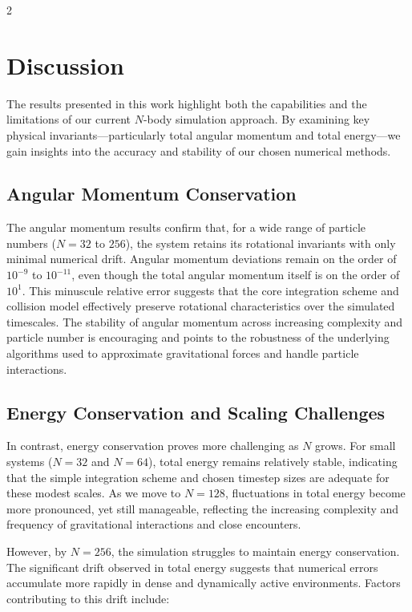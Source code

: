 \documentclass[a4paper, 12pt, oneside, onecolumn]{article}
\begin{document}
\begin{multicols}{2}

\section{Discussion}

The results presented in this work highlight both the capabilities and the limitations of our current $N$-body simulation approach. By examining key physical invariants—particularly total angular momentum and total energy—we gain insights into the accuracy and stability of our chosen numerical methods.

\subsection*{Angular Momentum Conservation}

The angular momentum results confirm that, for a wide range of particle numbers ($N = 32$ to $256$), the system retains its rotational invariants with only minimal numerical drift. Angular momentum deviations remain on the order of $10^{-9}$ to $10^{-11}$, even though the total angular momentum itself is on the order of $10^1$. This minuscule relative error suggests that the core integration scheme and collision model effectively preserve rotational characteristics over the simulated timescales. The stability of angular momentum across increasing complexity and particle number is encouraging and points to the robustness of the underlying algorithms used to approximate gravitational forces and handle particle interactions.

\subsection*{Energy Conservation and Scaling Challenges}

In contrast, energy conservation proves more challenging as $N$ grows. For small systems ($N = 32$ and $N = 64$), total energy remains relatively stable, indicating that the simple integration scheme and chosen timestep sizes are adequate for these modest scales. As we move to $N = 128$, fluctuations in total energy become more pronounced, yet still manageable, reflecting the increasing complexity and frequency of gravitational interactions and close encounters.

However, by $N = 256$, the simulation struggles to maintain energy conservation. The significant drift observed in total energy suggests that numerical errors accumulate more rapidly in dense and dynamically active environments. Factors contributing to this drift include:


\end{multicols}
\end{document}
